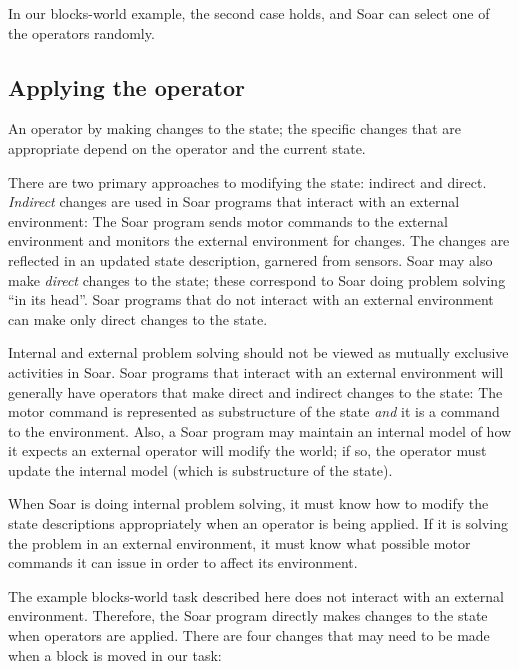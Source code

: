 In our blocks-world example, the second case holds, and Soar can select one of
the operators randomly.

\subsection{Applying the operator}

An operator  by making changes to the state; the specific changes
that are appropriate depend on the operator and the current state.

There are two primary approaches to modifying the state: indirect and direct.
\emph{Indirect} changes are used in Soar programs that interact with
an external environment: The Soar program sends motor commands to the
external environment and monitors the external environment for
changes. The changes are reflected in an updated state description,
garnered from sensors. Soar may also make \emph{direct} changes to the
state; these correspond to Soar doing problem solving ``in its
head''. Soar programs that do not interact with an external environment
can make only direct changes to the state.

Internal and external problem solving should not be viewed as mutually
exclusive activities in Soar. Soar programs that interact with an
external environment will generally have operators that make direct and
indirect changes to the state: The motor command is represented as
substructure of the state \emph{and} it is a command to the environment. Also, a Soar program may maintain an internal
model of how it expects an external operator will modify the world; if
so, the operator must update the internal model (which is substructure
of the state).

When Soar is doing internal problem solving, it must know how to modify
the state descriptions appropriately when an operator is being
applied. If it is solving the problem in an external environment, it
must know what possible motor commands it can issue in order to affect
its environment.

The example blocks-world task described here does not interact with an external
environment. Therefore, the Soar program directly makes changes to the state
when operators are applied. There are four changes that may need to be made
when a block is moved in our task: \vspace{-14pt}

